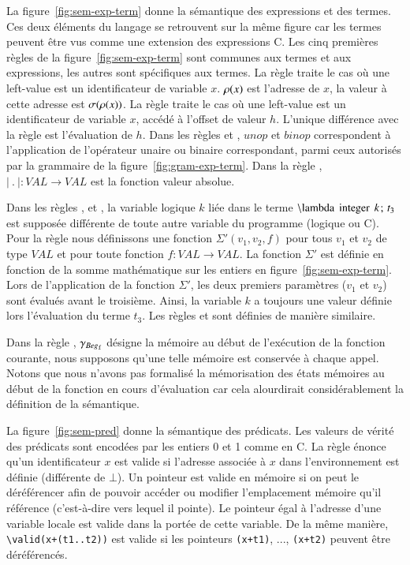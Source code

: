 La figure~\ref{fig:sem-exp-term} donne la sémantique des expressions et des
termes.
Ces deux éléments du langage se retrouvent sur la même figure car les termes
peuvent être vus comme une extension des expressions C.
Les cinq premières règles de la figure~\ref{fig:sem-exp-term} sont communes aux
termes et aux expressions, les autres sont spécifiques aux termes.
La règle  traite le cas où une left-value est un identificateur
de variable $x$.
$\rho(x)$ est l'adresse de $x$, la valeur à cette adresse est $\sigma(\rho(x))$.
La règle  traite le cas où une left-value est un identificateur
de variable $x$, accédé à l'offset de valeur $h$.
L'unique différence avec la règle  est l'évaluation de $h$.
Dans les règles  et , $\mathit{unop}$ et
$\mathit{binop}$ correspondent à l'application de l'opérateur unaire ou binaire
correspondant, parmi ceux autorisés par la grammaire de la
figure~\ref{fig:gram-exp-term}.
Dans la règle , $\lvert~.~\rvert : VAL \rightarrow VAL$ est la
fonction valeur absolue.

Dans les règles ,  et , la
variable logique $k$ liée dans le terme
$\mbox{\lstinline'\\lambda integer'}~k\semicolon~t_3$ est supposée différente de
toute autre variable du programme (logique ou C).
Pour la règle  nous définissons une fonction $\Sigma'(v_1,v_2,f)$
pour tous $v_1$ et $v_2$ de type $VAL$ et pour toute fonction
$f : VAL \rightarrow VAL$.
La fonction $\Sigma'$ est définie en fonction de la somme mathématique sur les
entiers en figure~\ref{fig:sem-exp-term}.
Lors de l'application de la fonction $\Sigma'$, les deux premiers paramètres
($v_1$ et $v_2$) sont évalués avant le troisième.
Ainsi, la variable $k$ a toujours une valeur définie lors l'évaluation du terme
$t_3$.
Les règles  et  sont définies de manière
similaire.

Dans la règle , $\gamma_{Beg_{\mathtt{f}}}$ désigne la mémoire au
début de l'exécution de la fonction courante, nous supposons
qu'une telle mémoire est conservée à chaque appel.
Notons que nous n'avons pas formalisé la mémorisation des états mémoires au
début de la fonction en cours d'évaluation car cela alourdirait considérablement
la définition de la sémantique.

La figure~\ref{fig:sem-pred} donne la sémantique des prédicats.
Les valeurs de vérité des prédicats sont encodées par les entiers 0 et 1 comme
en C.
La règle  énonce qu'un identificateur $x$ est valide
si l'adresse associée à $x$ dans l'environnement est définie (différente de
$\bot$).
Un pointeur est valide en mémoire si on peut le déréférencer afin de pouvoir
accéder ou modifier l'emplacement mémoire qu'il référence (c'est-à-dire vers
lequel il pointe).
Le pointeur égal à l'adresse d'une variable locale est valide dans la portée de
cette variable.
De la même manière, \lstinline'\valid(x+(t1..t2))' est valide si les pointeurs
\lstinline'(x+t1)', ..., \lstinline'(x+t2)' peuvent être déréférencés.

